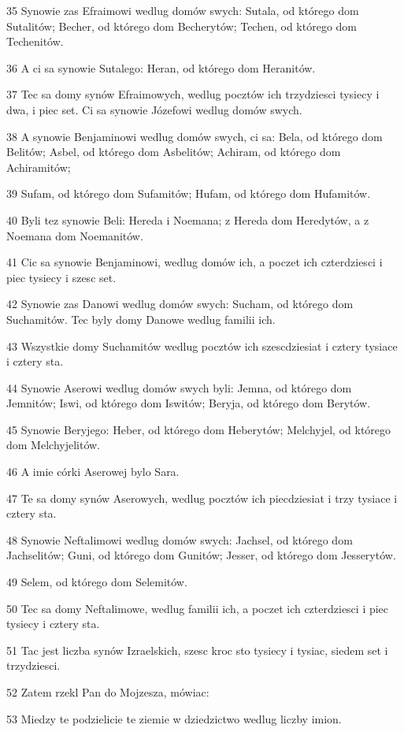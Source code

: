 \par 35 Synowie zas Efraimowi wedlug domów swych: Sutala, od którego dom Sutalitów; Becher, od którego dom Becherytów; Techen, od którego dom Techenitów.
\par 36 A ci sa synowie Sutalego: Heran, od którego dom Heranitów.
\par 37 Tec sa domy synów Efraimowych, wedlug pocztów ich trzydziesci tysiecy i dwa, i piec set. Ci sa synowie Józefowi wedlug domów swych.
\par 38 A synowie Benjaminowi wedlug domów swych, ci sa: Bela, od którego dom Belitów; Asbel, od którego dom Asbelitów; Achiram, od którego dom Achiramitów;
\par 39 Sufam, od którego dom Sufamitów; Hufam, od którego dom Hufamitów.
\par 40 Byli tez synowie Beli: Hereda i Noemana; z Hereda dom Heredytów, a z Noemana dom Noemanitów.
\par 41 Cic sa synowie Benjaminowi, wedlug domów ich, a poczet ich czterdziesci i piec tysiecy i szesc set.
\par 42 Synowie zas Danowi wedlug domów swych: Sucham, od którego dom Suchamitów. Tec byly domy Danowe wedlug familii ich.
\par 43 Wszystkie domy Suchamitów wedlug pocztów ich szescdziesiat i cztery tysiace i cztery sta.
\par 44 Synowie Aserowi wedlug domów swych byli: Jemna, od którego dom Jemnitów; Iswi, od którego dom Iswitów; Beryja, od którego dom Berytów.
\par 45 Synowie Beryjego: Heber, od którego dom Heberytów; Melchyjel, od którego dom Melchyjelitów.
\par 46 A imie córki Aserowej bylo Sara.
\par 47 Te sa domy synów Aserowych, wedlug pocztów ich piecdziesiat i trzy tysiace i cztery sta.
\par 48 Synowie Neftalimowi wedlug domów swych: Jachsel, od którego dom Jachselitów; Guni, od którego dom Gunitów; Jesser, od którego dom Jesserytów.
\par 49 Selem, od którego dom Selemitów.
\par 50 Tec sa domy Neftalimowe, wedlug familii ich, a poczet ich czterdziesci i piec tysiecy i cztery sta.
\par 51 Tac jest liczba synów Izraelskich, szesc kroc sto tysiecy i tysiac, siedem set i trzydziesci.
\par 52 Zatem rzekl Pan do Mojzesza, mówiac:
\par 53 Miedzy te podzielicie te ziemie w dziedzictwo wedlug liczby imion.
